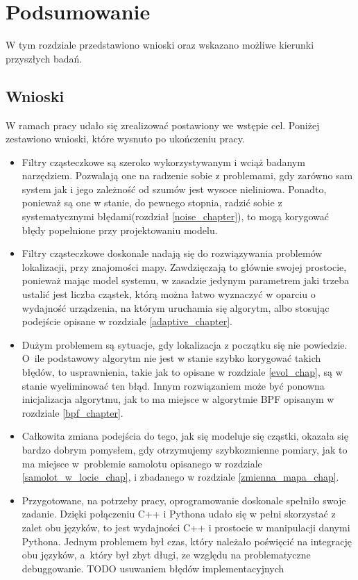 \chapter{Podsumowanie}
W tym rozdziale przedstawiono wnioski oraz wskazano możliwe kierunki przyszłych badań.
\section{Wnioski}
W ramach pracy udało się zrealizować postawiony we wstępie cel. Poniżej zestawiono wnioski, które wysnuto po ukończeniu pracy.
\begin{itemize}
	\item Filtry cząsteczkowe są szeroko wykorzystywanym i wciąż badanym narzędziem. Pozwalają one na radzenie sobie z problemami, gdy zarówno sam system jak i jego zależność od szumów jest wysoce nieliniowa. Ponadto, ponieważ są one w stanie, do pewnego stopnia, radzić sobie z systematycznymi błędami(rozdział \ref{noise_chapter}), to mogą korygować błędy popełnione przy projektowaniu modelu.
	\item Filtry cząsteczkowe doskonale nadają się do rozwiązywania problemów lokalizacji, przy znajomości mapy. Zawdzięczają to głównie swojej prostocie, ponieważ mając model systemu, w zasadzie jedynym parametrem jaki trzeba ustalić jest liczba cząstek, którą można łatwo wyznaczyć w oparciu o wydajność urządzenia, na którym uruchamia się algorytm, albo stosując podejście opisane w rozdziale \ref{adaptive_chapter}.
	\item Dużym problemem są sytuacje, gdy lokalizacja z początku się nie powiedzie. O~ile podstawowy algorytm nie jest w stanie szybko korygować takich błędów, to usprawnienia, takie jak to opisane w rozdziale \ref{evol_chap}, są w stanie wyeliminować ten błąd. Innym rozwiązaniem może być ponowna inicjalizacja algorytmu, jak to ma miejsce w algorytmie BPF opisanym w rozdziale \ref{bpf_chapter}.
	\item Całkowita zmiana podejścia do tego, jak się modeluje się cząstki, okazała się bardzo dobrym pomysłem, gdy otrzymujemy szybkozmienne pomiary, jak to ma miejsce w~problemie samolotu opisanego w rozdziale \ref{samolot_w_locie_chap}, i zbadanego w rozdziale \ref{zmienna_mapa_chap}.
	\item Przygotowane, na potrzeby pracy, oprogramowanie doskonale spełniło swoje zadanie. Dzięki połączeniu C++ i Pythona udało się w pełni skorzystać z zalet obu języków, to jest wydajności C++ i prostocie w manipulacji danymi Pythona. Jednym problemem był czas, który należało poświęcić na integrację obu języków, a~który był zbyt długi, ze względu na problematyczne debuggowanie. TODO usuwaniem błędów implementacyjnych
\end{itemize}

